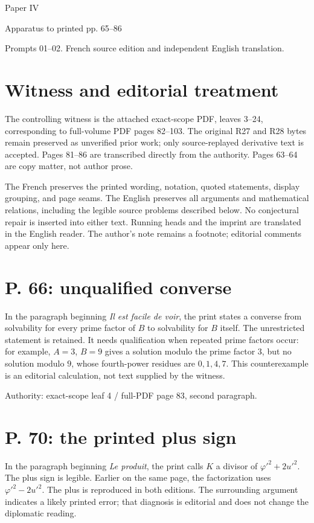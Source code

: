 \documentclass[11pt]{article}
\begin{document}
{\LARGE Paper IV}\par
{\large Apparatus to printed pp. 65–86}\par
Prompts 01–02. French source edition and independent English translation.

\section*{Witness and editorial treatment}
The controlling witness is the attached exact-scope PDF, leaves 3–24, corresponding
to full-volume PDF pages 82–103. The original R27 and R28 bytes remain preserved
as unverified prior work; only source-replayed derivative text is accepted.
Pages 81–86 are transcribed directly from the authority. Pages 63–64 are copy matter, not author prose.

The French preserves the printed wording, notation, quoted statements, display
grouping, and page seams. The English preserves all arguments and mathematical
relations, including the legible source problems described below. No conjectural
repair is inserted into either text. Running heads and the imprint are translated
in the English reader. The author’s note remains a footnote; editorial comments
appear only here.

\section*{P. 66: unqualified converse}
In the paragraph beginning \emph{Il est facile de voir}, the print states a converse
from solvability for every prime factor of $B$ to solvability for $B$ itself.
The unrestricted statement is retained. It needs qualification when repeated prime
factors occur: for example, $A=3$, $B=9$ gives a solution modulo the prime factor $3$,
but no solution modulo $9$, whose fourth-power residues are $0,1,4,7$.
This counterexample is an editorial calculation, not text supplied by the witness.

Authority: exact-scope leaf 4 / full-PDF page 83, second paragraph.

\section*{P. 70: the printed plus sign}
In the paragraph beginning \emph{Le produit}, the print calls $K$ a divisor of
$\varphi'^2+2u'^2$. The plus sign is legible. Earlier on the same page, the factorization
uses $\varphi'^2-2u'^2$. The plus is reproduced in both editions. The surrounding
argument indicates a likely printed error; that diagnosis is editorial and does
not change the diplomatic reading.
\end{document}
